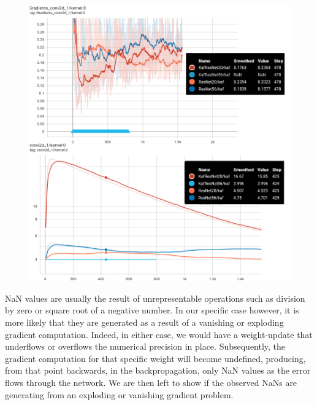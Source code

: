 \documentclass[LaM,binding=0.6cm]{./packages/sapthesis/sapthesis}
\begin{document}
        \begin{figure}[h!]
            \centering
            \includegraphics[scale=0.32]{conv1.png}
            \caption{}
            \label{fig:gradconv1}
        \end{figure}
        NaN values are usually the result of unrepresentable operations such as division by zero or square root of a negative number. In our specific case however, it is more likely that they are generated as a result 
        of a vanishing or exploding gradient computation. Indeed, in either case, we would have a weight-update that underflows or overflows the numerical precision in place. Subsequently, the gradient computation for that 
        specific weight will become undefined, producing, from that point backwards, in the backpropagation, only NaN values as the error flows through the network. We are then left to show if the observed NaNs are generating 
        from an exploding or vanishing gradient problem.
\end{document}
